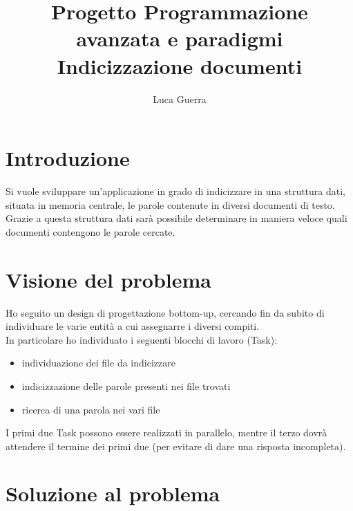 \documentclass{article}
\begin{document}
\title{Progetto Programmazione avanzata e paradigmi \\ Indicizzazione documenti}

\author{Luca Guerra}

\maketitle

\section{Introduzione}
Si vuole sviluppare un'applicazione in grado di indicizzare in una struttura dati, situata in memoria centrale, le parole contenute in diversi documenti di testo. Grazie a questa struttura dati sarà possibile determinare in maniera veloce quali documenti contengono le parole cercate.

\section{Visione del problema}
Ho seguito un design di progettazione bottom-up, cercando fin da subito di individuare le varie entità a cui assegnarre i diversi compiti.\\
In particolare ho individuato i seguenti blocchi di lavoro (Task):
\begin{itemize}
  \item individuazione dei file da indicizzare
  \item indicizzazione delle parole presenti nei file trovati
  \item ricerca di una parola nei vari file
\end{itemize} 
I primi due Task possono essere realizzati in parallelo, mentre il terzo dovrà attendere il termine dei primi due (per evitare di dare una risposta incompleta).

\section{Soluzione al problema}
\end{document}
